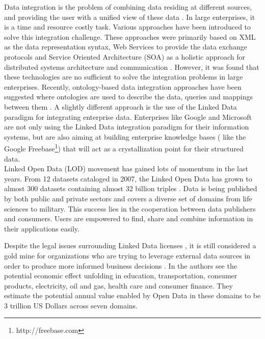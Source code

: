 \documentclass[onecolumn, crcready]{iosart2c}
\begin{document}
Data integration is the problem of combining data residing at different sources, and providing the user with a unified view of these data \cite{Lenzerini:2002:DIT:543613.543644}. In large enterprises, it is a time and resource costly task. Various approaches have been introduced to solve this integration challenge. These approaches were primarily based on XML as the data representation syntax, Web Services to provide the data exchange protocols and Service Oriented Architecture (SOA) as a holistic approach for distributed systems architecture and communication \cite{frischmuth2103a}\cite{frischmuth2012linked}. However, it was found that these technologies are no sufficient to solve the integration problems in large enterprises. Recently, ontology-based data integration approaches have been suggested where ontologies are used to describe the data, queries and mappings between them \cite{Wache01ontology-basedintegration}. A slightly different approach is the use of the Linked Data paradigm \cite{bizer_linked_2009} for integrating enterprise data. Enterprises like Google and Microsoft are not only using the Linked Data integration paradigm for their information systems, but are also aiming at building enterprise knowledge bases ( like the Google Freebase\footnote{http://freebase.com}) that will act as a crystallization point for their structured data.\\

Linked Open Data (LOD) movement has gained lots of momentum in the last years. From 12 datasets cataloged in 2007, the Linked Open Data has grown to almost 300 datasets containing almost 32 billion triples \cite{bizer2011}. Data is being published by both public and private sectors and covers a diverse set of domains from life sciences to military. This success lies in the cooperation between data publishers and consumers. Users are empowered to find, share and combine information in their applications easily. 

Despite the legal issues surrounding Linked Data licenses \cite{nomoneyLOD}, it is still considered a gold mine for organizations who are trying to leverage external data sources in order to produce more informed business decisions \cite{Boyd2011}. In \cite{mckinseyreport} the authors see the potential economic effect unfolding in education, transportation, consumer products, electricity, oil and gas, health care and consumer finance. They estimate the potential annual value enabled by Open Data in these domains to be 3 trillion US Dollars across seven domains. 
\end{document}
